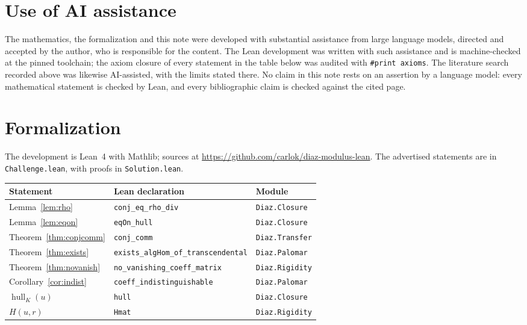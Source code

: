 \documentclass[11pt]{article}
\theoremstyle{definition}
\theoremstyle{remark}
\newcommand{\hull}{\operatorname{hull}}
\begin{document}
\section{Use of AI assistance}

The mathematics, the formalization and this note were developed with substantial
assistance from large language models, directed and accepted by the author, who
is responsible for the content. The Lean development was written with such
assistance and is machine-checked at the pinned toolchain; the axiom closure of
every statement in the table below was audited with \verb|#print axioms|. The
literature search recorded above was likewise AI-assisted, with the limits
stated there. No claim in this note rests on an assertion by a language model:
every mathematical statement is checked by Lean, and every bibliographic claim
is checked against the cited page.

\section{Formalization}

The development is Lean~4 with Mathlib; sources at
\url{https://github.com/carlok/diaz-modulus-lean}. The advertised statements are
in \texttt{Challenge.lean}, with proofs in \texttt{Solution.lean}.

\begin{center}
\begin{tabular}{lll}
\hline
Statement & Lean declaration & Module\\
\hline
Lemma~\ref{lem:rho} & \texttt{conj\_eq\_rho\_div} & \texttt{Diaz.Closure}\\
Lemma~\ref{lem:eqon} & \texttt{eqOn\_hull} & \texttt{Diaz.Closure}\\
Theorem~\ref{thm:conjcomm} & \texttt{conj\_comm} & \texttt{Diaz.Transfer}\\
Theorem~\ref{thm:exists} & \texttt{exists\_algHom\_of\_transcendental} & \texttt{Diaz.Palomar}\\
Theorem~\ref{thm:novanish} & \texttt{no\_vanishing\_coeff\_matrix} & \texttt{Diaz.Rigidity}\\
Corollary~\ref{cor:indist} & \texttt{coeff\_indistinguishable} & \texttt{Diaz.Palomar}\\
$\hull_K(u)$ & \texttt{hull} & \texttt{Diaz.Closure}\\
$H(u,r)$ & \texttt{Hmat} & \texttt{Diaz.Rigidity}\\
\hline
\end{tabular}
\end{center}
\end{document}
